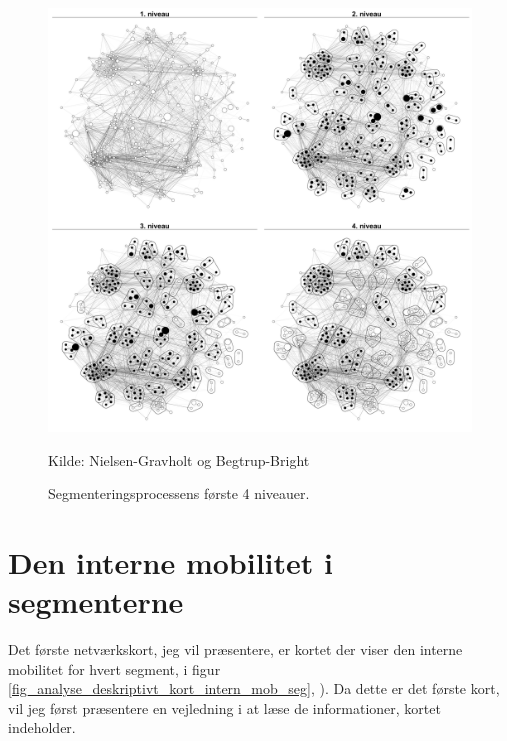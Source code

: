 %
%
\begin{figure}[H]
\begin{center}
	\caption{Segmenteringsprocessens første 4 niveauer.}
	\label{fig_analyse_deskriptivt_kort_seg_proces}
	\includegraphics[width=1.0\textwidth]{fig/netvaerkskort/kort_seg_proces.pdf}
	\centerline{ \tiny{Kilde: Nielsen-Gravholt og Begtrup-Bright}}
\end{center}
\end{figure}
\restoregeometry
%
%

\section{Den interne mobilitet i segmenterne \label{analyse_deskriptivt_within_mob_seg}}


Det første netværkskort, jeg vil præsentere, er kortet der viser den interne mobilitet for hvert segment,  i figur \ref{fig_analyse_deskriptivt_kort_intern_mob_seg}, ). %
Da dette er det første kort, vil jeg først præsentere en vejledning i at læse de informationer, kortet indeholder. 

